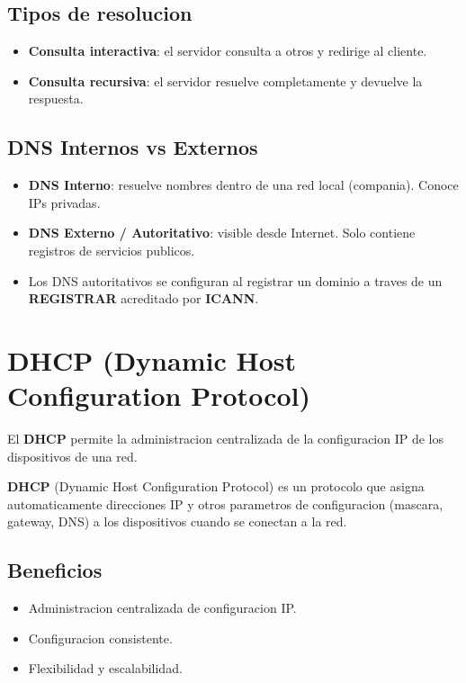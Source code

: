 \subsection{Tipos de resolucion}

\begin{itemize}
    \item \textbf{Consulta interactiva}: el servidor consulta a otros y redirige al cliente.
    \item \textbf{Consulta recursiva}: el servidor resuelve completamente y devuelve la respuesta.
\end{itemize}

\subsection{DNS Internos vs Externos}

\begin{itemize}
    \item \textbf{DNS Interno}: resuelve nombres dentro de una red local (compania). Conoce IPs privadas.
    \item \textbf{DNS Externo / Autoritativo}: visible desde Internet. Solo contiene registros de servicios publicos.
    \item Los DNS autoritativos se configuran al registrar un dominio a traves de un \textbf{REGISTRAR} acreditado por \textbf{ICANN}.
\end{itemize}


\section{DHCP (Dynamic Host Configuration Protocol)}

El \textbf{DHCP} permite la administracion centralizada de la configuracion IP de los dispositivos de una red.

\begin{definicion}
\textbf{DHCP} (Dynamic Host Configuration Protocol) es un protocolo que asigna automaticamente direcciones IP y otros parametros de configuracion (mascara, gateway, DNS) a los dispositivos cuando se conectan a la red.
\end{definicion}

\subsection{Beneficios}

\begin{itemize}
    \item Administracion centralizada de configuracion IP.
    \item Configuracion consistente.
    \item Flexibilidad y escalabilidad.
\end{itemize}


